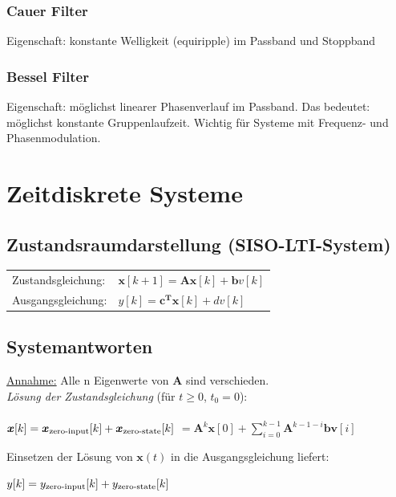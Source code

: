 \documentclass[a4paper,landscape,6pt]{article}
\newcommand{\ma}[1]{\ensuremath{\boldsymbol {#1}}}								%
\renewcommand{\vec}[1]{\ensuremath{\boldsymbol {#1}}}							%
\newcommand{\ul}[1]{\underline{#1}}
\begin{document}
\begin{multicols}{3}
\subsubsection*{Cauer Filter}
Eigenschaft: konstante Welligkeit (equiripple) im Passband und Stoppband

\subsubsection*{Bessel Filter}
Eigenschaft: möglichst linearer Phasenverlauf im Passband.
Das bedeutet: möglichst konstante Gruppenlaufzeit. Wichtig für Systeme mit Frequenz- und Phasenmodulation.

\section{Zeitdiskrete Systeme}
\subsection*{Zustandsraumdarstellung \footnotesize{(SISO-LTI-System)}}
\begin{tabular}{ll}
	Zustandsgleichung: & $ \vec x[k+1] = \ma A \vec x[k] + \vec b v[k] $\\
	Ausgangsgleichung: & $ y[k] = \vec c^{\ma T} \vec x[k] + d v[k]$ \\	
\end{tabular}

\subsection*{Systemantworten}
\ul{Annahme:} Alle n Eigenwerte von $\ma A$ sind verschieden.\\

\textit{Lösung der Zustandsgleichung} (für $t \ge 0$, $t_0 = 0$):\\\\
$\vec x [k] =  \vec x_{\textmd{zero-input}}[k] + \vec x_{\textmd{zero-state}}[k]$ \newline
$= \ma A^k \vec x [0] + \sum\limits_{i=0}^{k-1} \ma A^{k-1-i} \vec b \vec v[i]$

Einsetzen der Lösung von $\vec x(t)$ in die Ausgangsgleichung liefert:\newline

$y[k] = y_{\textmd{zero-input}}[k] + y_{\textmd{zero-state}}[k]$\newline


\end{multicols}
\end{document}
